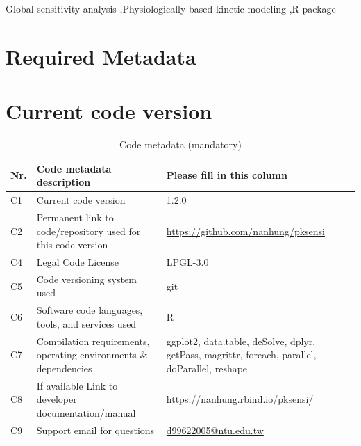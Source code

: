 \documentclass[preprint,12pt, a4paper]{elsarticle}
\begin{document}
\begin{frontmatter}
\begin{abstract}
\end{abstract}

\begin{keyword}
  Global sensitivity analysis \sep Physiologically based kinetic modeling \sep R package



\end{keyword}

\end{frontmatter}

\newpage

\section*{Required Metadata}

\section*{Current code version}

\begin{table}[H]
\begin{tabular}{|l|p{6.5cm}|p{6.5cm}|}
\hline
\textbf{Nr.} & \textbf{Code metadata description} & \textbf{Please fill in this column} \\
\hline
C1 & Current code version & 1.2.0 \\
\hline
C2 & Permanent link to code/repository used for this code version & \url{https://github.com/nanhung/pksensi} \\
\hline
C4 & Legal Code License & LPGL-3.0 \\
\hline
C5 & Code versioning system used & git \\
\hline
C6 & Software code languages, tools, and services used & R \\
\hline
C7 & Compilation requirements, operating environments \& dependencies & ggplot2, data.table, deSolve, dplyr, getPass, magrittr, foreach, parallel, doParallel, reshape \\
\hline
C8 & If available Link to developer documentation/manual & \url{https://nanhung.rbind.io/pksensi/} \\
\hline
C9 & Support email for questions & \url{d99622005@ntu.edu.tw} \\
\hline
\end{tabular}
\caption{Code metadata (mandatory)}
\label{} 
\end{table}
\end{document}
